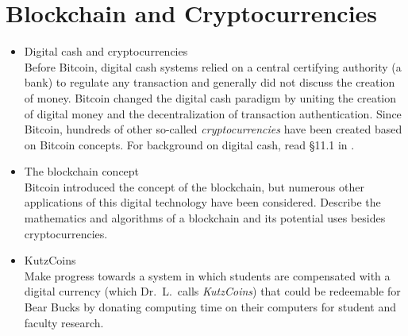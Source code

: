 \chapter{Blockchain and Cryptocurrencies}
\label{ch:chain}

\begin{itemize}
    \item Digital cash and cryptocurrencies\\
    Before Bitcoin, digital cash systems relied on a central certifying authority (a bank) to regulate any transaction and generally did not discuss the creation of money. Bitcoin changed the digital cash paradigm by uniting the creation of digital money and the decentralization of transaction authentication. Since Bitcoin, hundreds of other so-called {\em cryptocurrencies} have been created based on Bitcoin concepts. For background on digital cash, read \S 11.1 in \cite{tw}.
    \item{The blockchain concept}\\
    Bitcoin introduced the concept of the blockchain, but numerous other applications of this digital technology have been considered. Describe the mathematics and algorithms of a blockchain and its potential uses besides cryptocurrencies.
    \item{KutzCoins}\\
    Make progress towards a system in which students are compensated with a digital currency (which Dr.\ L.\ calls {\em KutzCoins}) that could be redeemable for Bear Bucks by donating computing time on their computers for student and faculty research.
\end{itemize}
